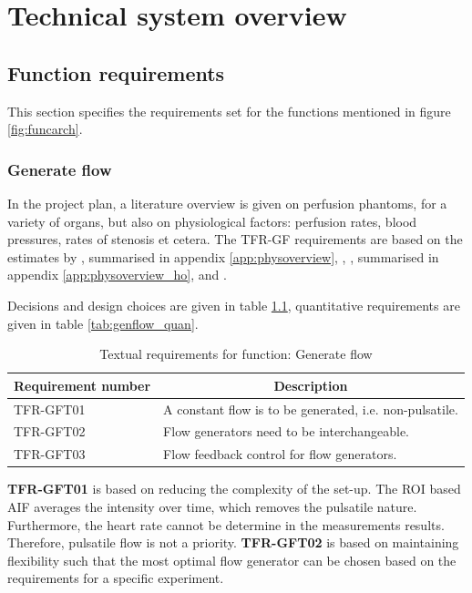 \chapter{Technical system overview}

\section{Function requirements}
This section specifies the requirements set for the functions mentioned in figure \ref{fig:funcarch}.
\subsection{Generate flow}
In the project plan, a literature overview is given on perfusion phantoms, for a variety of organs, but also on physiological factors: perfusion rates, blood pressures, rates of stenosis et cetera. The TFR-GF requirements are based on the estimates by \cite{uren1994relation}, summarised in appendix \ref{app:physoverview}, \cite{chiribiri2013normal}, \cite{ho2014dynamic}, summarised in appendix \ref{app:physoverview_ho}, and \cite{slart2015pres}.

Decisions and design choices are given in table \ref{tab:genflow_text}, quantitative requirements are given in table \ref{tab:genflow_quan}.

\begin{table}[H]
\caption{Textual requirements for function: Generate flow}
\label{tab:genflow_text}
\begin{tabular}{p{25mm}|p{115mm}|}
	\textbf{Requirement number} & \multicolumn{1}{c}{\textbf{Description}} \\
	\hline
	TFR-GFT01 & A constant flow is to be generated, i.e. non-pulsatile. \\
	TFR-GFT02 & Flow generators need to be interchangeable. \\
	TFR-GFT03 & Flow feedback control for flow generators. \\
	\cline{2-2}
\end{tabular}
\end{table}

\textbf{TFR-GFT01} is based on reducing the complexity of the set-up. The ROI based AIF averages the intensity over time, which removes the pulsatile nature. Furthermore, the heart rate cannot be determine in the measurements results. Therefore, pulsatile flow is not a priority.
\textbf{
TFR-GFT02} is based on maintaining flexibility such that the most optimal flow generator can be chosen based on the requirements for a specific experiment.

